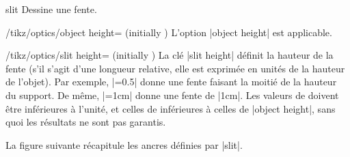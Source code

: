 \documentclass[a4paper]{ltxdoc}
\begin{document}
\begin{shape}{slit}
Dessine une fente.

\begin{codeexample}[width=6cm]
\end{codeexample}

\begin{key}{/tikz/optics/object height= (initially )}
    L'option |object height| est applicable.
\end{key}


\begin{key}{/tikz/optics/slit height= (initially )}
La clé |slit height| définit la hauteur de la fente (s'il s'agit d'une longueur relative, elle est exprimée en unités de la hauteur de l'objet).
Par exemple, |=0.5| donne une fente faisant la moitié de la hauteur du support. De même, |=1cm| donne une fente de |1cm|. Les valeurs de  doivent être inférieures à l'unité, et celles de  inférieures à celles de |object height|, sans quoi les résultats ne sont pas garantis.

\begin{codeexample}[width=6cm]
\end{codeexample}
\end{key}

La figure suivante récapitule les ancres définies par |slit|.

\begin{codeexample}[]
\Huge
{}
\end{codeexample}

\end{shape}
\end{document}
